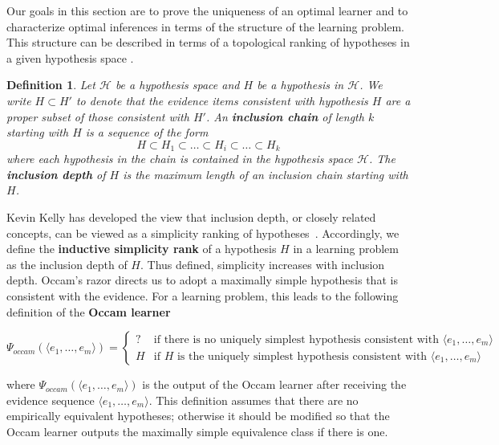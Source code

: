 \documentclass{elsarticle}%
\newtheorem{definition}[theorem]{Definition}
\newcommand{\learnera}{\Psi}
\newcommand{\occam}{\learnera_{\mathit{occam}}}
\newcommand{\hypothesis}{H}
\newcommand{\hypotheses}{\mathcal{H}}
\begin{document}
Our goals in this section are to prove the uniqueness of an optimal learner and to characterize optimal inferences in terms of the structure of the learning problem. This structure can be described in terms of a topological ranking of hypotheses in a given hypothesis space \cite{luo06:_mind_chang_effic_learn}. 

\begin{definition}
Let $\hypotheses$ be a hypothesis space and $\hypothesis$ be
a hypothesis in $\hypotheses$. We write $\hypothesis \subset \hypothesis'$ to denote that the evidence items consistent with hypothesis $\hypothesis$ are a proper subset of those consistent with $\hypothesis'$. An \textbf{inclusion chain} of length $k$ starting with $\hypothesis$ is a sequence of the form 
\[ 
\hypothesis \subset \hypothesis_1\subset
\dots\subset \hypothesis_i\subset \dots\subset \hypothesis_k
\]
where each hypothesis in the chain is contained in the hypothesis space $\hypotheses$. The \textbf{inclusion depth}
of $\hypothesis$ is the maximum length of an inclusion chain starting with $\hypothesis$.
\end{definition}

Kevin Kelly has developed the view that inclusion depth, or closely related concepts, can be viewed as a simplicity ranking of hypotheses~\cite{kelly04:_justif_truth_findin_effic}. Accordingly, we define the \textbf{inductive simplicity rank} of a hypothesis $\hypothesis$ in a learning problem as the inclusion depth of $\hypothesis$. Thus defined, simplicity increases with inclusion depth. Occam's razor directs us to adopt a maximally simple hypothesis that is consistent with the evidence. For a learning problem, this leads to the following definition of the \textbf{Occam learner}

$$
\occam(\langle e_{1},\ldots,e_{m}\rangle)=
\begin{cases}
? & \text{if there is no uniquely simplest hypothesis consistent with  }\langle e_{1},\ldots,e_{m}\rangle\\
\hypothesis & \text{if $\hypothesis$ is the uniquely simplest hypothesis consistent with  }\langle e_{1},\ldots,e_{m}\rangle
\end{cases}
$$

\noindent where $\occam(\langle e_{1},\ldots,e_{m}\rangle)$ is the output of the Occam learner after receiving the evidence sequence $\langle e_{1},\ldots,e_{m}\rangle$. This definition assumes that there are no empirically equivalent hypotheses; otherwise it should be modified so that the Occam learner outputs the maximally simple equivalence class if there is one. 
\end{document}
